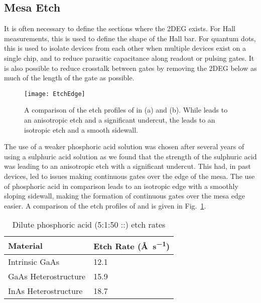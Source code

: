 \subsection{Mesa Etch}
\label{sec:mesaetch}
It is often necessary to define the sections where the 2DEG exists. For Hall measurements, this is used to define the shape of the Hall bar.
For quantum dots, this is used to isolate devices from each other when multiple devices exist on a single chip, and to reduce parasitic
capacitance along readout or pulsing gates. It is also possible to reduce crosstalk between gates by removing the 2DEG below
as much of the length of the gate as possible\cite{doi:10.1063/1.4752863}.

\begin{figure}
    \texttt{[image: EtchEdge]}
    \caption[Etch profile of  and ]
    {\label{fig:etchedge}A comparison of the etch profiles of  in (a) and  (b). While  leads
    to an anisotropic etch and a significant undercut, the  leads to an isotropic etch and a smooth sidewall.}
\end{figure}

The use of a weaker phosphoric acid solution was chosen after several years of using a sulphuric acid solution as we found that the
strength of the sulphuric acid was leading to an anisotropic etch with a significant undercut. This had, in past devices, led to issues making
continuous gates over the edge of the mesa. The use of phosphoric acid in comparison leads to
an isotropic edge with a smoothly sloping sidewall, making the formation of continuous gates over the mesa edge easier.
A comparison of the etch profiles of  and  is given in Fig.~\ref{fig:etchedge}.

\begin{table}
    \centering
    \begin{tabular}{ll}
        \toprule
        Material & Etch Rate (\si{\angstrom\per\second}) \\
        \midrule
        Intrinsic GaAs & 12.1 \\
        GaAs Heterostructure & 15.9 \\
        InAs Heterostructure & 18.7 \\
        \bottomrule
    \end{tabular}
    \caption[Dilute phosphoric acid (5:1:50 ::) etch rates]
    {Dilute phosphoric acid (5:1:50 ::) etch rates}
    \label{tab:etchratess}
\end{table}

